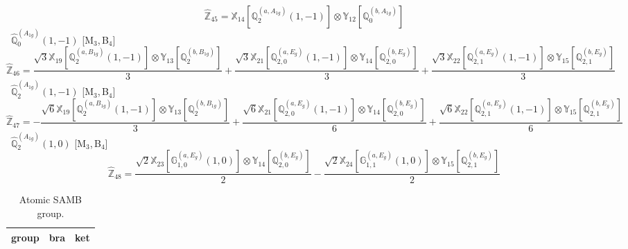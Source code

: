 \documentclass[fleqn,10pt,landscape]{article}
\begin{document}
\begin{itemize}
\begin{dmath*}
\hat{\mathbb{Z}}_{45}=\mathbb{X}_{14}[\mathbb{Q}_{2}^{(a,A_{1g})}(1,-1)] \otimes\mathbb{Y}_{12}[\mathbb{Q}_{0}^{(b,A_{1g})}]
\end{dmath*}
\vspace{4mm}
\noindent {} $\,\,\,\hat{\mathbb{Q}}_{0}^{(A_{1g})}(1,-1)$ [M$_{3}$,\,B$_{4}$]
\begin{dmath*}
\hat{\mathbb{Z}}_{46}=\frac{\sqrt{3} \mathbb{X}_{19}[\mathbb{Q}_{2}^{(a,B_{1g})}(1,-1)] \otimes\mathbb{Y}_{13}[\mathbb{Q}_{2}^{(b,B_{1g})}]}{3} + \frac{\sqrt{3} \mathbb{X}_{21}[\mathbb{Q}_{2,0}^{(a,E_{g})}(1,-1)] \otimes\mathbb{Y}_{14}[\mathbb{Q}_{2,0}^{(b,E_{g})}]}{3} + \frac{\sqrt{3} \mathbb{X}_{22}[\mathbb{Q}_{2,1}^{(a,E_{g})}(1,-1)] \otimes\mathbb{Y}_{15}[\mathbb{Q}_{2,1}^{(b,E_{g})}]}{3}
\end{dmath*}
\vspace{4mm}
\noindent {} $\,\,\,\hat{\mathbb{Q}}_{2}^{(A_{1g})}(1,-1)$ [M$_{3}$,\,B$_{4}$]
\begin{dmath*}
\hat{\mathbb{Z}}_{47}=- \frac{\sqrt{6} \mathbb{X}_{19}[\mathbb{Q}_{2}^{(a,B_{1g})}(1,-1)] \otimes\mathbb{Y}_{13}[\mathbb{Q}_{2}^{(b,B_{1g})}]}{3} + \frac{\sqrt{6} \mathbb{X}_{21}[\mathbb{Q}_{2,0}^{(a,E_{g})}(1,-1)] \otimes\mathbb{Y}_{14}[\mathbb{Q}_{2,0}^{(b,E_{g})}]}{6} + \frac{\sqrt{6} \mathbb{X}_{22}[\mathbb{Q}_{2,1}^{(a,E_{g})}(1,-1)] \otimes\mathbb{Y}_{15}[\mathbb{Q}_{2,1}^{(b,E_{g})}]}{6}
\end{dmath*}
\vspace{4mm}
\noindent {} $\,\,\,\hat{\mathbb{Q}}_{2}^{(A_{1g})}(1,0)$ [M$_{3}$,\,B$_{4}$]
\begin{dmath*}
\hat{\mathbb{Z}}_{48}=\frac{\sqrt{2} \mathbb{X}_{23}[\mathbb{G}_{1,0}^{(a,E_{g})}(1,0)] \otimes\mathbb{Y}_{14}[\mathbb{Q}_{2,0}^{(b,E_{g})}]}{2} - \frac{\sqrt{2} \mathbb{X}_{24}[\mathbb{G}_{1,1}^{(a,E_{g})}(1,0)] \otimes\mathbb{Y}_{15}[\mathbb{Q}_{2,1}^{(b,E_{g})}]}{2}
\end{dmath*}
\begin{center}
\renewcommand{\arraystretch}{1.3}
\begin{longtable}{c|c|c}
\caption{Atomic SAMB group.}
 \\
 \hline \hline
group & bra & ket \\ \hline \endfirsthead


\end{longtable}
\end{center}
\end{itemize}
\end{document}
